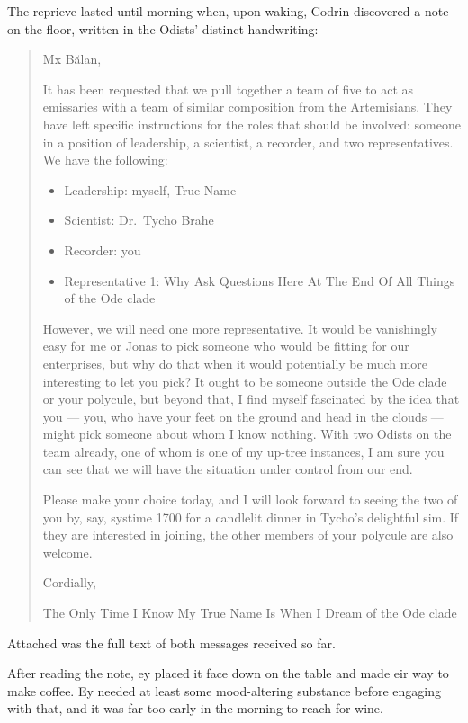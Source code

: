 The reprieve lasted until morning when, upon waking, Codrin discovered a note on the floor, written in the Odists' distinct handwriting:

\begin{quote}
Mx Bălan,

It has been requested that we pull together a team of five to act as emissaries with a team of similar composition from the Artemisians. They have left specific instructions for the roles that should be involved: someone in a position of leadership, a scientist, a recorder, and two representatives. We have the following:

\begin{itemize}
\tightlist
\item
  Leadership: myself, True Name
\item
  Scientist: Dr.~Tycho Brahe
\item
  Recorder: you
\item
  Representative 1: Why Ask Questions Here At The End Of All Things of the Ode clade
\end{itemize}

However, we will need one more representative. It would be vanishingly easy for me or Jonas to pick someone who would be fitting for our enterprises, but why do that when it would potentially be much more interesting to let you pick? It ought to be someone outside the Ode clade or your polycule, but beyond that, I find myself fascinated by the idea that you — you, who have your feet on the ground and head in the clouds — might pick someone about whom I know nothing. With two Odists on the team already, one of whom is one of my up-tree instances, I am sure you can see that we will have the situation under control from our end.

Please make your choice today, and I will look forward to seeing the two of you by, say, systime 1700 for a candlelit dinner in Tycho's delightful sim. If they are interested in joining, the other members of your polycule are also welcome.

Cordially,

The Only Time I Know My True Name Is When I Dream of the Ode clade
\end{quote}

Attached was the full text of both messages received so far.

After reading the note, ey placed it face down on the table and made eir way to make coffee. Ey needed at least some mood-altering substance before engaging with that, and it was far too early in the morning to reach for wine.

